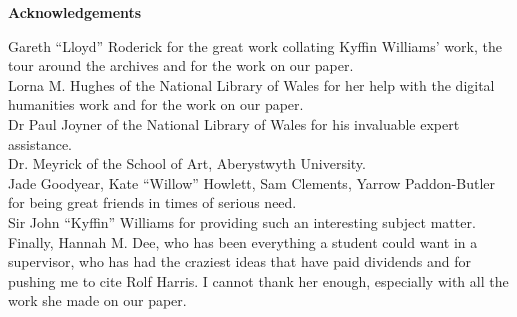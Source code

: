 \thispagestyle{empty}

\begin{center}
    {\LARGE\bf Acknowledgements}
\end{center}

Gareth ``Lloyd'' Roderick for the great work collating Kyffin Williams' work, the tour around the 
archives and for the work on our paper.\\

Lorna M. Hughes of the National Library of Wales for her help with the digital humanities work and
for the work on our paper.\\

Dr Paul Joyner of the National Library of Wales for his invaluable expert assistance.\\

Dr. Meyrick of the School of Art, Aberystwyth University.\\

Jade Goodyear, Kate ``Willow'' Howlett, Sam Clements, Yarrow Paddon-Butler for being great friends
in times of serious need.\\

Sir John ``Kyffin'' Williams for providing such an interesting subject matter.\\

Finally, Hannah M. Dee, who has been everything a student could want in a supervisor, who has had
the craziest ideas that have paid dividends and for pushing me to cite Rolf Harris. I cannot thank
her enough, especially with all the work she made on our paper.\\
